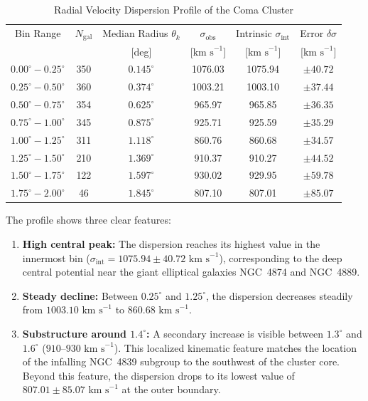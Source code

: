 \documentclass[twocolumn]{aastex631}
\begin{document}
\begin{table}[ht!]
	\centering
	\caption{Radial Velocity Dispersion Profile of the Coma Cluster}
	\label{tab:kinematic_profile}
	\begin{tabular}{cccccc}
		\hline \hline
		Bin Range & $N_{\text{gal}}$ & Median Radius $\theta_k$ & $\sigma_{\text{obs}}$ & Intrinsic $\sigma_{\text{int}}$ & Error $\delta\sigma$ \\
		          &                  & [deg]                    & [$\text{km s}^{-1}$]  & [$\text{km s}^{-1}$]            & [$\text{km s}^{-1}$] \\
		\hline
		$0.00^\circ - 0.25^\circ$ & 350 & $0.145^\circ$ & 1076.03 & 1075.94 & $\pm 40.72$ \\
		$0.25^\circ - 0.50^\circ$ & 360 & $0.374^\circ$ & 1003.21 & 1003.10 & $\pm 37.44$ \\
		$0.50^\circ - 0.75^\circ$ & 354 & $0.625^\circ$ & 965.97  & 965.85  & $\pm 36.35$ \\
		$0.75^\circ - 1.00^\circ$ & 345 & $0.875^\circ$ & 925.71  & 925.59  & $\pm 35.29$ \\
		$1.00^\circ - 1.25^\circ$ & 311 & $1.118^\circ$ & 860.76  & 860.68  & $\pm 34.57$ \\
		$1.25^\circ - 1.50^\circ$ & 210 & $1.369^\circ$ & 910.37  & 910.27  & $\pm 44.52$ \\
		$1.50^\circ - 1.75^\circ$ & 122 & $1.597^\circ$ & 930.02  & 929.95  & $\pm 59.78$ \\
		$1.75^\circ - 2.00^\circ$ & 46  & $1.845^\circ$ & 807.10  & 807.01  & $\pm 85.07$ \\
		\hline
	\end{tabular}
\end{table}

The profile shows three clear features:
\begin{enumerate}
	\item \textbf{High central peak:} The dispersion reaches its highest value in the innermost bin ($\sigma_{\text{int}} = 1075.94 \pm 40.72\text{ km s}^{-1}$), corresponding to the deep central potential near the giant elliptical galaxies NGC~4874 and NGC~4889.
	\item \textbf{Steady decline:} Between $0.25^\circ$ and $1.25^\circ$, the dispersion decreases steadily from $1003.10\text{ km s}^{-1}$ to $860.68\text{ km s}^{-1}$.
	\item \textbf{Substructure around $1.4^\circ$:} A secondary increase is visible between $1.3^\circ$ and $1.6^\circ$ ($910\text{--}930\text{ km s}^{-1}$). This localized kinematic feature matches the location of the infalling NGC~4839 subgroup to the southwest of the cluster core. Beyond this feature, the dispersion drops to its lowest value of $807.01 \pm 85.07\text{ km s}^{-1}$ at the outer boundary.
\end{enumerate}
\end{document}
